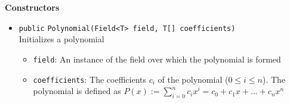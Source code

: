 \textbf{Constructors}
\begin{itemize}
\item \lstinline|public| \lstinline|Polynomial|\lstinline|(Field<T> field, T[] coefficients)|\\
Initializes a polynomial
\begin{itemize}
\item \lstinline|field|: An instance of the field over which the polynomial is formed
\item \lstinline|coefficients|: The coefficients $c_i$ of the polynomial ($0 \leq i \leq n$).
 The polynomial is defined as $P(x) := \sum_{i=0}^n c_i x^i = c_0 + c_1
 x + ... + c_n x^n$
\end{itemize}



\end{itemize}


